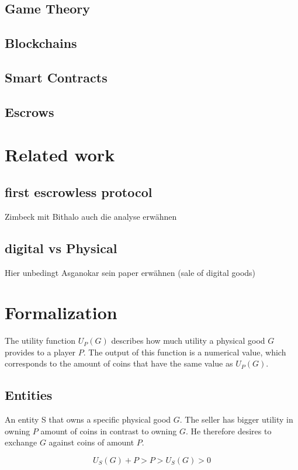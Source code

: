 \documentclass{cacthesis}
\begin{document}
\section{Game Theory}
\section{Blockchains}
\section{Smart Contracts}
\section{Escrows}

\chapter{Related work}
\section{first escrowless protocol}
Zimbeck mit Bithalo
auch die analyse erwähnen
\section{digital vs Physical}
Hier unbedingt Asganokar sein paper erwähnen (sale of digital goods)

\chapter{Formalization}
The utility function $U_P(G)$ describes how much utility a physical good $G$ provides to a player $P$. The output of this function is a numerical value, which corresponds to the amount of coins that have the same value as $U_P(G)$.
\section{Entities}

An entity S that owns a specific physical good $G$. The seller has bigger utility in owning $P$ amount of coins in contrast to owning $G$. He therefore desires to exchange $G$ against coins of amount $P$.

\begin{equation}
    U_S(G) + P > P > U_S(G) > 0
\end{equation}
\end{document}
